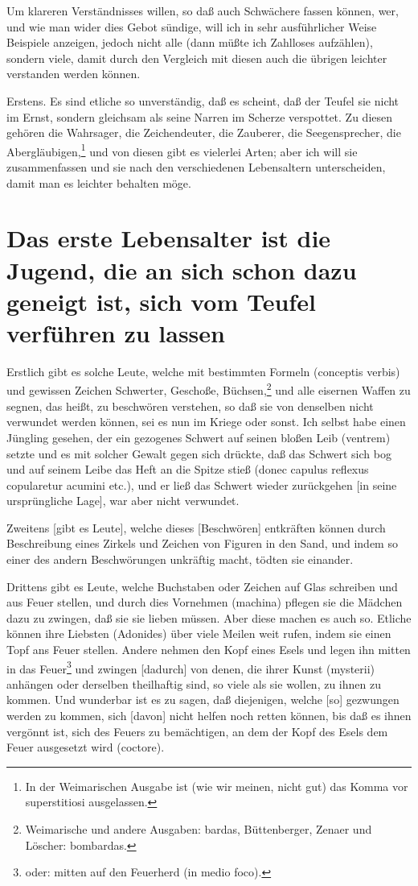 Um klareren Verständnisses willen, so daß auch Schwächere fassen können, wer, und wie man wider dies Gebot sündige, will ich in sehr ausführlicher Weise Beispiele anzeigen, jedoch nicht alle (dann müßte ich Zahlloses aufzählen), sondern viele, damit durch den Vergleich mit diesen auch die übrigen leichter verstanden werden können.

Erstens. Es sind etliche so unverständig, daß es scheint, daß der Teufel sie nicht im Ernst, sondern gleichsam als seine Narren im Scherze verspottet. Zu diesen gehören die Wahrsager, die Zeichendeuter, die Zauberer, die Seegensprecher, die Abergläubigen,\footnote{In der Weimarischen Ausgabe ist (wie wir meinen, nicht gut) das Komma vor superstitiosi ausgelassen.} und von diesen gibt es vielerlei Arten; aber ich will sie zusammenfassen und sie nach den verschiedenen Lebensaltern unterscheiden, damit man es leichter behalten möge.

\section[Das erste Lebensalter ist die Jugend, die an sich]{Das erste Lebensalter ist die Jugend, die an sich schon dazu geneigt ist, sich vom Teufel verführen zu lassen}

Erstlich gibt es solche Leute, welche mit bestimmten Formeln (conceptis verbis) und gewissen Zeichen Schwerter, Geschoße, Büchsen,\footnote{Weimarische und andere Ausgaben: bardas, Büttenberger, Zenaer und Löscher: bombardas.} und alle eisernen Waffen zu segnen, das heißt, zu beschwören verstehen, so daß sie von denselben nicht verwundet werden können, sei es nun im
Kriege oder sonst. Ich selbst habe einen Jüngling gesehen, der ein gezogenes Schwert auf seinen bloßen Leib (ventrem) setzte und es mit solcher Gewalt gegen sich drückte, daß das Schwert sich bog und auf seinem Leibe das Heft an die Spitze stieß (donec capulus reflexus copularetur acumini etc.), und er ließ das Schwert wieder zurückgehen [in seine ursprüngliche Lage], war aber nicht verwundet.

Zweitens [gibt es Leute], welche dieses [Beschwören] entkräften können durch Beschreibung eines Zirkels und Zeichen von Figuren in den Sand, und indem so einer des andern Beschwörungen unkräftig macht, tödten sie einander.

Drittens gibt es Leute, welche Buchstaben oder Zeichen auf Glas schreiben und aus Feuer stellen, und durch dies Vornehmen (machina) pflegen sie die Mädchen dazu zu zwingen, daß sie sie lieben müssen. Aber diese machen es auch so. Etliche können ihre Liebsten (Adonides) über viele Meilen weit rufen, indem sie einen Topf ans Feuer stellen. Andere nehmen den Kopf eines Esels und legen ihn mitten in das Feuer\footnote{oder: mitten auf den Feuerherd (in medio foco).} und zwingen [dadurch] von denen, die ihrer Kunst (mysterii) anhängen oder derselben theilhaftig sind, so viele als sie wollen, zu ihnen zu kommen. Und wunderbar ist es zu sagen, daß diejenigen, welche [so] gezwungen werden zu kommen, sich [davon] nicht helfen noch retten können, bis daß es ihnen vergönnt ist, sich des Feuers zu bemächtigen, an dem der Kopf des Esels dem Feuer ausgesetzt wird (coctore).

